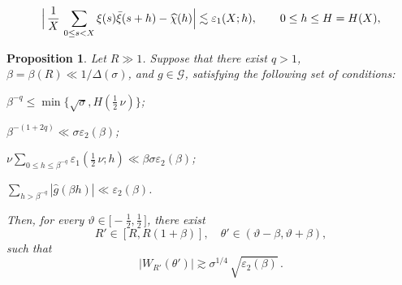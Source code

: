 \documentclass[10pt,a4paper]{amsart}
\newtheorem{proposition}{Proposition}
\def\ep{{\varepsilon}}
\begin{document}
\begin{equation}\label{eq:C1}
\Bigl|\, \frac1X\, \sum_{0\le s < X} \xi(s)\bar\xi(s+h) - \widehat{\chi}(h) \Bigr|
\lesssim \ep_1(X; h), \qquad 0\le h \le H=H(X),
\end{equation}

\begin{proposition}\label{Lemma5a}
Let $R\gg 1$. Suppose that there exist $q>1$, $\beta=\beta(R)\ll 1/\Delta(\sigma)$,
and $g\in \mathcal G$, satisfying the following set of conditions:

\smallskip{}
$\beta^{-q} \le \min\bigl\{\sqrt{\sigma}, H(\tfrac12\, \nu)\bigr\}$;

\medskip{}
$\beta^{-(1+2q)} \ll \sigma\ep_2(\beta)$;

\medskip{}
$\displaystyle \nu \sum_{0\le h \le \beta^{-q}} \ep_1(\tfrac12\, \nu; h) \ll \beta\sigma\ep_2(\beta) $;

\medskip{}
$\displaystyle \sum_{h>\beta^{-q}} |\widehat{g}(\beta h)| \ll \ep_2(\beta) $.

\smallskip
Then, for every $\vartheta\in \bigl[-\tfrac12,  \tfrac12\, \bigr]$, there exist
\[
R'\in [R, R(1+\beta)],  \quad \theta'\in (\vartheta-\beta, \vartheta+\beta),
\]
such that
\[
|W_{R'}(\theta')| \gtrsim \sigma^{1/4}\, \sqrt{\ep_2 (\beta)}\,.
\]
\end{proposition}
\end{document}

